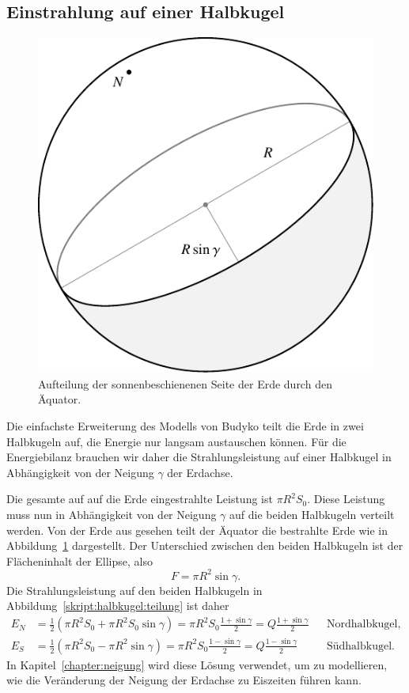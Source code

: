 %
%
%
\subsection{Einstrahlung auf einer Halbkugel}
\begin{figure}
\centering
\includegraphics{chapters/5/halb.pdf}
\caption{Aufteilung der sonnenbeschienenen Seite der Erde durch den
Äquator.
\label{skript:halbkugel:teilung}}
\end{figure}%
Die einfachste Erweiterung des Modells von Budyko teilt die
Erde in zwei Halbkugeln auf, die Energie nur langsam austauschen
können.
Für die Energiebilanz brauchen wir daher die Strahlungsleistung
auf einer Halbkugel in Abhängigkeit von der Neigung $\gamma$ der
Erdachse.

Die gesamte auf auf die Erde eingestrahlte Leistung ist $\pi R^2S_0$.
Diese Leistung muss nun in Abhängigkeit von der Neigung $\gamma$
auf die beiden Halbkugeln verteilt werden.
Von der Erde aus gesehen teilt der Äquator die bestrahlte Erde wie
in Abbildung~\ref{skript:halbkugel:teilung} dargestellt.
Der Unterschied zwischen den beiden Halbkugeln ist der Flächeninhalt
der Ellipse, also
\[
F=\pi R^2\sin\gamma.
\]
Die Strahlungsleistung auf den beiden Halbkugeln in
Abbildung~\eqref{skript:halbkugel:teilung} ist daher
\begin{align}
E_N
&= 
\frac12(\pi R^2 S_0 +\pi R^2S_0\sin\gamma)
=
\pi R^2S_0 \frac{1+\sin\gamma}2 = Q\frac{1+\sin\gamma}2
&&\text{Nordhalbkugel,}
\\
E_S
&= 
\frac12(\pi R^2 S_0 -\pi R^2\sin\gamma)
=
\pi R^2S_0 \frac{1-\sin\gamma}2 = Q\frac{1-\sin\gamma}2
&&\text{Südhalbkugel.}
\end{align}
In Kapitel~\ref{chapter:neigung} wird diese Lösung verwendet, um zu
modellieren, wie die Veränderung der Neigung der Erdachse zu Eiszeiten
führen kann.




